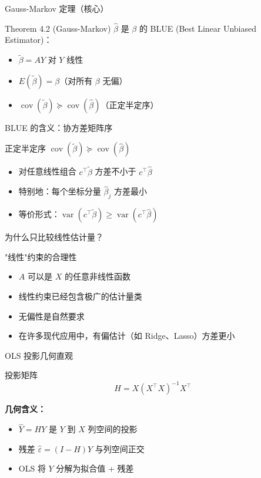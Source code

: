 \documentclass[]{beamer}
\DeclareMathOperator{\cov}{cov}
\DeclareMathOperator{\var}{var}
\begin{document}
\begin{frame}{Gauss-Markov 定理（核心）}
\begin{block}{Theorem 4.2 (Gauss-Markov)}
$\hat{\beta}$ 是 $\beta$ 的 BLUE (Best Linear Unbiased Estimator)：
\begin{itemize}
  \item[(C1)] $\tilde{\beta} = AY$ 对 $Y$ 线性
  \item[(C2)] $E(\tilde{\beta}) = \beta$（对所有 $\beta$ 无偏）
  \item[$\Rightarrow$] $\cov(\tilde{\beta}) \succeq \cov(\hat{\beta})$（正定半定序）
\end{itemize}
\end{block}
\end{frame}

\begin{frame}{BLUE 的含义：协方差矩阵序}
\begin{block}{正定半定序 $\cov(\tilde{\beta}) \succeq \cov(\hat{\beta})$}
\begin{itemize}
  \item 对任意线性组合 $c^\top \tilde{\beta}$ 方差不小于 $c^\top \hat{\beta}$
  \item 特别地：每个坐标分量 $\hat{\beta}_j$ 方差最小
  \item 等价形式：$\var(c^\top \tilde{\beta}) \geq \var(c^\top \hat{\beta})$
\end{itemize}
\end{block}
\end{frame}

\begin{frame}{为什么只比较线性估计量？}
\begin{block}{"线性"约束的合理性}
\begin{itemize}
  \item $A$ 可以是 $X$ 的任意非线性函数
  \item 线性约束已经包含极广的估计量类
  \item 无偏性是自然要求
  \item 在许多现代应用中，有偏估计（如 Ridge、Lasso）方差更小
\end{itemize}
\end{block}
\end{frame}

\begin{frame}{OLS 投影几何直观}
\begin{block}{投影矩阵}
\[
H = X(X^\top X)^{-1}X^\top
\]
\end{block}
\vspace{0.5em}
\textbf{几何含义：}
\begin{itemize}
  \item $\hat{Y} = HY$ 是 $Y$ 到 $X$ 列空间的投影
  \item 残差 $\hat{\varepsilon} = (I-H)Y$ 与列空间正交
  \item OLS 将 $Y$ 分解为拟合值 + 残差
\end{itemize}
\end{frame}
\end{document}
